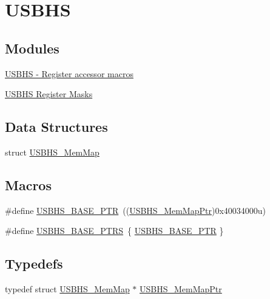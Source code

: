 \hypertarget{group___u_s_b_h_s___peripheral}{}\section{U\+S\+B\+H\+S}
\label{group___u_s_b_h_s___peripheral}
\subsection*{Modules}
\begin{DoxyCompactItemize}
\item 
\hyperlink{group___u_s_b_h_s___register___accessor___macros}{U\+S\+B\+H\+S -\/ Register accessor macros}
\item 
\hyperlink{group___u_s_b_h_s___register___masks}{U\+S\+B\+H\+S Register Masks}
\end{DoxyCompactItemize}
\subsection*{Data Structures}
\begin{DoxyCompactItemize}
\item 
struct \hyperlink{struct_u_s_b_h_s___mem_map}{U\+S\+B\+H\+S\+\_\+\+Mem\+Map}
\end{DoxyCompactItemize}
\subsection*{Macros}
\begin{DoxyCompactItemize}
\item 
\#define \hyperlink{group___u_s_b_h_s___peripheral_gaa2bc10b8cd66f96acd39e15b3a581306}{U\+S\+B\+H\+S\+\_\+\+B\+A\+S\+E\+\_\+\+P\+T\+R}~((\hyperlink{group___u_s_b_h_s___peripheral_gad58a0f182a04a4f695b4e3f7043111a2}{U\+S\+B\+H\+S\+\_\+\+Mem\+Map\+Ptr})0x40034000u)
\item 
\#define \hyperlink{group___u_s_b_h_s___peripheral_ga294121020be1028778e1508a789d7105}{U\+S\+B\+H\+S\+\_\+\+B\+A\+S\+E\+\_\+\+P\+T\+R\+S}~\{ \hyperlink{group___u_s_b_h_s___peripheral_gaa2bc10b8cd66f96acd39e15b3a581306}{U\+S\+B\+H\+S\+\_\+\+B\+A\+S\+E\+\_\+\+P\+T\+R} \}
\end{DoxyCompactItemize}
\subsection*{Typedefs}
\begin{DoxyCompactItemize}
\item 
typedef struct \hyperlink{struct_u_s_b_h_s___mem_map}{U\+S\+B\+H\+S\+\_\+\+Mem\+Map} $\ast$ \hyperlink{group___u_s_b_h_s___peripheral_gad58a0f182a04a4f695b4e3f7043111a2}{U\+S\+B\+H\+S\+\_\+\+Mem\+Map\+Ptr}
\end{DoxyCompactItemize}


